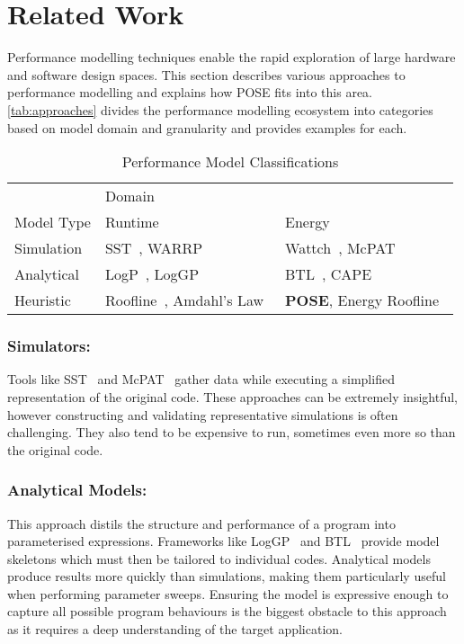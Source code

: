 \section{Related Work}
\label{sec:related}
Performance modelling techniques enable the rapid exploration of large hardware and software design spaces.
This section describes various approaches to performance modelling and explains how POSE fits into this area.
\autoref{tab:approaches} divides the performance modelling ecosystem into categories based on model domain and granularity and provides examples for each.

\begin{table}
  \centering
  \caption{Performance Model Classifications}
  \setlength{\tabcolsep}{8pt}
  \begin{tabular}{lll}
  \toprule
    & \multicolumn{2}{l}{Domain}\\ \cmidrule(){2-3}
  Model Type  & Runtime & Energy \\
    \midrule
  Simulation & SST~\cite{rodrigues:2011aa}, WARRP~\cite{hammond:2009aa} & Wattch~\cite{brooks:2000aa}, McPAT~\cite{li:2009aa}  \\
  Analytical & LogP~\cite{culler:1993aa}, LogGP~\cite{alexandrov:1997aa} & BTL~\cite{manousakis:2012aa}, CAPE~\cite{kamble:1997aa} \\
  Heuristic & Roofline~\cite{williams:2009aa}, Amdahl's Law~\cite{amdahl:1967aa} & \textbf{POSE}, Energy Roofline~\cite{choi:2013aa} \\
  \bottomrule
  \end{tabular}
  \label{tab:approaches}
\end{table}

\subsubsection{Simulators:} 
Tools like SST~\cite{rodrigues:2011aa} and McPAT~\cite{li:2009aa} gather data while executing a simplified representation of the original code.
These approaches can be extremely insightful, however constructing and validating representative simulations is often challenging.
They also tend to be expensive to run, sometimes even more so than the original code.

\subsubsection{Analytical Models:} This approach distils the structure and performance of a program into parameterised expressions.
Frameworks like LogGP~\cite{alexandrov:1997aa} and BTL~\cite{manousakis:2012aa} provide model skeletons which must then be tailored to individual codes.
Analytical models produce results more quickly than simulations, making them particularly useful when performing parameter sweeps.
Ensuring the model is expressive enough to capture all possible program behaviours is the biggest obstacle to this approach as it requires a deep understanding of the target application.


